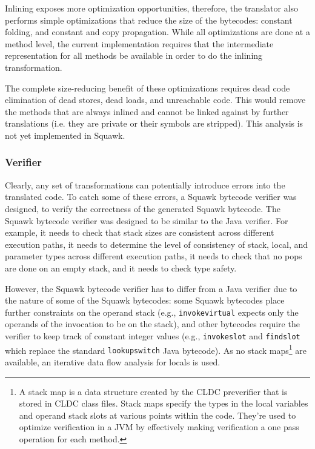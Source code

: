 \documentclass{sigplanconf}
\begin{document}
Inlining exposes more optimization opportunities, therefore, the translator
also performs simple optimizations that reduce the size of the bytecodes: 
constant folding, and constant and copy propagation. 
While all optimizations are done at a method level, the current implementation
requires that the intermediate representation for all methods be
available in order to do the inlining transformation.

The complete size-reducing benefit of these optimizations
requires dead code elimination of dead stores, dead loads, and 
unreachable code.   
This would  remove the methods that are always inlined and cannot be 
linked against by further translations (i.e. they are private or their 
symbols are stripped).
This analysis is not yet implemented in Squawk.


\subsubsection*{Verifier}

Clearly, any set of transformations can potentially introduce errors into
the translated code.  To catch some of these errors, a Squawk bytecode
verifier was designed, to verify the correctness of the generated
Squawk bytecode.
The Squawk bytecode verifier was designed to be similar to the
Java verifier. For example, it needs to check that stack sizes are
consistent across different execution paths, it needs to
determine the level of consistency of stack, local, and parameter
types across different execution paths, it needs to check that
no pops are done on an empty stack, and it needs to check type
safety.

However, the Squawk bytecode verifier has to differ from a
Java verifier due to the nature of some of the Squawk bytecodes:
some Squawk bytecodes place further constraints on the operand stack
(e.g., {\tt invokevirtual} expects only the operands of the
invocation to be on the stack),
and other bytecodes require the verifier to keep track of constant 
integer values (e.g., {\tt invokeslot} and {\tt findslot} which
replace the standard {\tt lookupswitch} Java bytecode). 
As no stack maps\footnote{
A stack map is a data structure created by the CLDC preverifier
that is stored in CLDC class files.  Stack maps specify the types
in the local variables and operand stack slots at various
points within the code. They're used to optimize verification
in a JVM by effectively making verification a one pass operation
for each method.}
are available, an iterative data flow analysis
for locals is used. 
\end{document}
